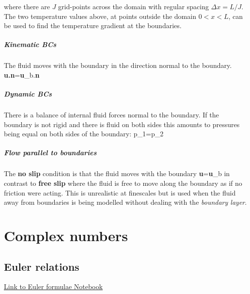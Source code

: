 where there are $J$ grid-points across the domain with regular spacing
$\Delta x=L/J$. The two temperature values above, at points outside the
domain $0<x<L$, can be used to find the temperature gradient at the
boundaries.

\paragraph{Kinematic BCs}

The fluid moves with the boundary in the direction normal to the boundary.
\BEQ
{\bf u.n}={\bf u}_b.{\bf n}
\EEQ

\paragraph{Dynamic BCs}

There is a balance of internal fluid forces normal to the boundary. If
the boundary is not rigid and there is fluid on both sides this
amounts to pressures being equal on both sides of the boundary: 
\BEQ
p_1=p_2 
\EEQ

\paragraph{Flow parallel to boundaries}

The {\bf no slip} condition is that the fluid moves with the boundary
\BEQ
{\bf u}={\bf u}_b
\EEQ
in contrast to {\bf free slip} where the fluid is free to move along
the boundary as if no friction were acting. This is unrealistic at
finescales but is used when the fluid away from boundaries
is being modelled without dealing with the {\em boundary layer}. 

\vspace{1em} 

\newpage

\newpage
\chapter{Complex numbers}

\section{Euler relations}
\href{https://github.com/pierluigividale/MTMW14/blob/main/Notebooks/Euler%20equations.ipynb}{Link to Euler formulae Notebook}

